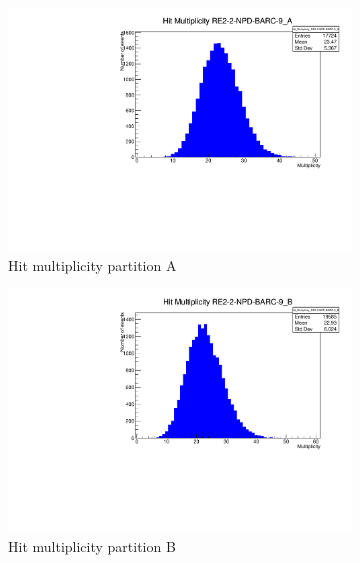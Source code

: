 	\begin{figure}[H]
    	\begin{subfigure}{0.5\linewidth}
			\centering
    		\includegraphics[width = \linewidth]{fig/chapt5/Hit_Multiplicity_RE2-2-NPD-BARC-9_A.pdf}
        	\caption{\label{fig:rate-scan:A} Hit multiplicity partition A}
    	\end{subfigure}
    	\begin{subfigure}{0.5\linewidth}
			\centering
    		\includegraphics[width = \linewidth]{fig/chapt5/Hit_Multiplicity_RE2-2-NPD-BARC-9_B.pdf}
        	\caption{\label{fig:rate-scan:B} Hit multiplicity partition B}
    	\end{subfigure}
    	\begin{subfigure}{0.5\linewidth}
			\centering

\end{subfigure}
\end{figure}
